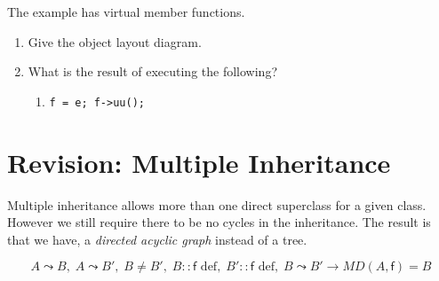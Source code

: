 \begin{example}
The example has virtual member functions.
\begin{enumerate}[noitemsep,topsep=0pt]
\renewcommand{\labelenumi}{\textbf{(\alph{enumi})}}
\renewcommand{\labelenumii}{\textbf{(\roman{enumii})}}
\item Give the object layout diagram.
\item What is the result of executing the following?
\begin{enumerate}[nosep,topsep=0pt]
\item \lstinline{f = e; f->uu();}
\end{enumerate}
\end{enumerate}




\end{example}



\section{Revision: Multiple Inheritance}

Multiple inheritance allows more than one direct superclass 
for a given class. However we still require there to be no cycles 
in the inheritance. The result is that we have, a \textit{directed acyclic graph}
instead of a tree. 








$$ A \leadsto B,\; A \leadsto B',\; B \neq B',\; B::\textsf{f} \text{ def},\; B'::\textsf{f} \text{ def},\; B \leadsto B' \rightarrow MD(A, \textsf{f}) = B $$


